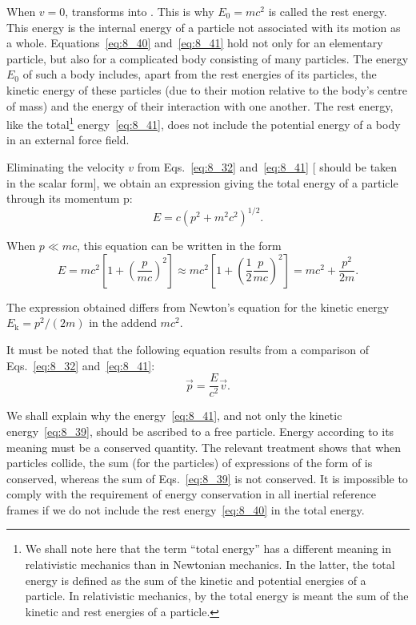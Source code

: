 When $v=0$,  transforms into . This is why $E_0=mc^2$ is called the rest energy. This energy is the internal energy of a particle not associated with its motion as a whole. Equations~\eqref{eq:8_40} and~\eqref{eq:8_41} hold not only for an elementary particle, but also for a complicated body consisting of many particles. The energy $E_0$ of such a body includes, apart from the rest energies of its particles, the kinetic energy of these particles (due to their motion relative to the body's centre of mass) and the energy of their interaction with one another. The rest energy, like the total\footnote{We shall note here that the term ``total energy'' has a different meaning in relativistic mechanics than in Newtonian mechanics. In the latter, the total energy is defined as the sum of the kinetic and potential energies of a particle. In relativistic mechanics, by the total energy is meant the sum of the kinetic and rest energies of a particle.} energy~\eqref{eq:8_41}, does not include the potential energy of a body in an external force field.

Eliminating the velocity $v$ from Eqs.~\eqref{eq:8_32} and~\eqref{eq:8_41} [ should be taken in the scalar form], we obtain an expression giving the total energy of a particle through its momentum p:
\begin{equation}\label{eq:8_42}
	E = c\left(p^2 + m^2c^2\right)^{1/2}.
\end{equation}

\noindent
When $p\ll mc$, this equation can be written in the form
\begin{equation}\label{eq:8_43}
	E = mc^2\left[1 + \left(\frac{p}{mc}\right)^2\right]\approx mc^2\left[1 + \left(\frac{1}{2}\frac{p}{mc}\right)^2\right] = mc^2 + \frac{p^2}{2m}.
\end{equation}

\noindent
The expression obtained differs from Newton's equation for the kinetic energy $E_{\text{k}}=p^2/(2m)$ in the addend $mc^2$.

It must be noted that the following equation results from a comparison of Eqs.~\eqref{eq:8_32} and~\eqref{eq:8_41}:
\begin{equation}\label{eq:8_44}
	\vec{p} = \frac{E}{c^2}\vec{v}.
\end{equation}

We shall explain why the energy~\eqref{eq:8_41}, and not only the kinetic energy~\eqref{eq:8_39}, should be ascribed to a free particle. Energy according to its meaning must be a conserved quantity. The relevant treatment shows that when particles collide, the sum (for the particles) of expressions of the form of  is conserved, whereas the sum of Eqs.~\eqref{eq:8_39} is not conserved. It is impossible to comply with the requirement of energy conservation in all inertial reference frames if we do not include the rest energy~\eqref{eq:8_40} in the total energy.

